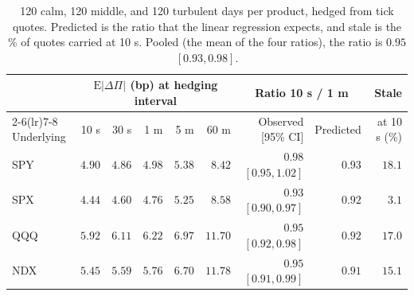 \begin{table}[tbp]
\centering
\footnotesize
\setlength{\tabcolsep}{4pt}
\begin{tabular}{lrrrrrrrr}
\toprule
 & \multicolumn{5}{c}{$\mathrm{E}|\Delta\Pi|$ (bp) at hedging interval} & \multicolumn{2}{c}{Ratio 10 s / 1 m} & Stale \\
\cmidrule(lr){2-6}\cmidrule(lr){7-8}
Underlying & 10 s & 30 s & 1 m & 5 m & 60 m & Observed [95\% CI] & Predicted & at 10 s (\%) \\
\midrule
SPY & $4.90$ & $4.86$ & $4.98$ & $5.38$ & $8.42$ & $0.98$ $[0.95, 1.02]$ & $0.93$ & $18.1$ \\
SPX & $4.44$ & $4.60$ & $4.76$ & $5.25$ & $8.58$ & $0.93$ $[0.90, 0.97]$ & $0.92$ & $3.1$ \\
QQQ & $5.92$ & $6.11$ & $6.22$ & $6.97$ & $11.70$ & $0.95$ $[0.92, 0.98]$ & $0.92$ & $17.0$ \\
NDX & $5.45$ & $5.59$ & $5.76$ & $6.70$ & $11.78$ & $0.95$ $[0.91, 0.99]$ & $0.91$ & $15.1$ \\
\bottomrule
\end{tabular}
\caption{120 calm, 120 middle, and 120 turbulent days per product, hedged from tick quotes. Predicted is the ratio that the linear regression expects, and stale is the \% of quotes carried at 10 s. Pooled (the mean of the four ratios), the ratio is $0.95$ $[0.93, 0.98]$.}
\label{tab:ticks4}
\end{table}
